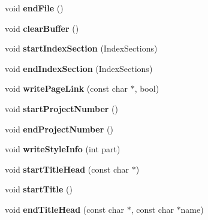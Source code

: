 \begin{DoxyCompactItemize}
void {\bfseries end\+File} ()
\item 
\mbox{\label{class_latex_generator_a6cb1e92e1a408514ee0a134eb955b0d4}} 
void {\bfseries clear\+Buffer} ()
\item 
\mbox{\label{class_latex_generator_a94d916061c6268e319d34645f8cd84f6}} 
void {\bfseries start\+Index\+Section} (Index\+Sections)
\item 
\mbox{\label{class_latex_generator_a6380cb1cf2ed1498d638b889fe4165ca}} 
void {\bfseries end\+Index\+Section} (Index\+Sections)
\item 
\mbox{\label{class_latex_generator_a78988d6557001983a64797823dd49343}} 
void {\bfseries write\+Page\+Link} (const char $\ast$, bool)
\item 
\mbox{\label{class_latex_generator_a35d152d0defd8ec3cc319e1b1717e87a}} 
void {\bfseries start\+Project\+Number} ()
\item 
\mbox{\label{class_latex_generator_a2bb769f495adda2f9b6e01aea5bd1eba}} 
void {\bfseries end\+Project\+Number} ()
\item 
\mbox{\label{class_latex_generator_ac1feab4756dc9795d056b72cc74379e4}} 
void {\bfseries write\+Style\+Info} (int part)
\item 
\mbox{\label{class_latex_generator_ab1e643c939b347638fcc36c2cb6c6f86}} 
void {\bfseries start\+Title\+Head} (const char $\ast$)
\item 
\mbox{\label{class_latex_generator_a4d1236763a4e5149866e3bae4961b13c}} 
void {\bfseries start\+Title} ()
\item 
\mbox{\label{class_latex_generator_a264ba2c261bfce85495574f970f26c67}} 
void {\bfseries end\+Title\+Head} (const char $\ast$, const char $\ast$name)
\item 
\mbox{\label{class_latex_generator_a39f79e928a962730a332e6d9dd9b251e}} 

\end{DoxyCompactItemize}
